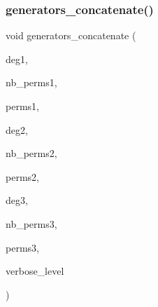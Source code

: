 \mbox{\label{group__generators_8_c_a64f33575c72912c506ec9678fe465734}} 
\subsubsection{\texorpdfstring{generators\+\_\+concatenate()}{generators\_concatenate()}}
{\footnotesize\ttfamily void generators\+\_\+concatenate (\begin{DoxyParamCaption}\item[{\mbox{\hyperlink{galois_8h_a09fddde158a3a20bd2dcadb609de11dc}{I\+NT}}}]{deg1,  }\item[{\mbox{\hyperlink{galois_8h_a09fddde158a3a20bd2dcadb609de11dc}{I\+NT}}}]{nb\+\_\+perms1,  }\item[{\mbox{\hyperlink{galois_8h_a09fddde158a3a20bd2dcadb609de11dc}{I\+NT}} $\ast$}]{perms1,  }\item[{\mbox{\hyperlink{galois_8h_a09fddde158a3a20bd2dcadb609de11dc}{I\+NT}}}]{deg2,  }\item[{\mbox{\hyperlink{galois_8h_a09fddde158a3a20bd2dcadb609de11dc}{I\+NT}}}]{nb\+\_\+perms2,  }\item[{\mbox{\hyperlink{galois_8h_a09fddde158a3a20bd2dcadb609de11dc}{I\+NT}} $\ast$}]{perms2,  }\item[{\mbox{\hyperlink{galois_8h_a09fddde158a3a20bd2dcadb609de11dc}{I\+NT}} \&}]{deg3,  }\item[{\mbox{\hyperlink{galois_8h_a09fddde158a3a20bd2dcadb609de11dc}{I\+NT}} \&}]{nb\+\_\+perms3,  }\item[{\mbox{\hyperlink{galois_8h_a09fddde158a3a20bd2dcadb609de11dc}{I\+NT}} $\ast$\&}]{perms3,  }\item[{\mbox{\hyperlink{galois_8h_a09fddde158a3a20bd2dcadb609de11dc}{I\+NT}}}]{verbose\+\_\+level }\end{DoxyParamCaption})}

\mbox{\label{group__generators_8_c_ae5fbb75d2a69e84babab04ffc5fd8f08}} 
